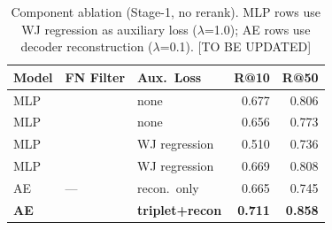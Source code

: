 \documentclass[sigconf]{acmart}
\newcommand{\cmark}{\ding{51}}
\newcommand{\xmark}{\ding{55}}
\begin{document}



\begin{table}[t]
\centering
\caption{Component ablation (Stage-1, no rerank). MLP rows use WJ regression
as auxiliary loss ($\lambda$=1.0); AE rows use decoder reconstruction ($\lambda$=0.1). [TO BE UPDATED]}
\label{tab:ablation}
\small
\setlength{\tabcolsep}{3pt}
\begin{tabular}{lllrr}
\toprule
Model & FN Filter & Aux.\ Loss & R@10 & R@50 \\
\midrule
MLP & \xmark & none          & 0.677 & 0.806 \\
MLP & \cmark & none          & 0.656 & 0.773 \\
MLP & \xmark & WJ regression & 0.510 & 0.736 \\
MLP & \cmark & WJ regression & 0.669 & 0.808 \\
\midrule
AE  & ---    & recon.\ only  & 0.665 & 0.745 \\
\textbf{AE}  & \cmark & \textbf{triplet+recon} & \textbf{0.711} & \textbf{0.858} \\
\bottomrule
\end{tabular}
\end{table}
\end{document}
